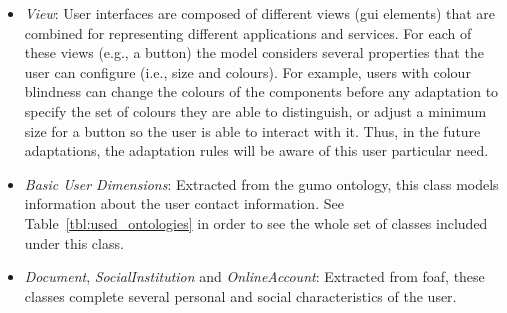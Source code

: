 \begin{itemize}
  \item \textit{View}: User interfaces are composed of different views (\acs{gui} 
  elements) that are combined for representing different applications and services. 
  For each of these views (e.g., a button) the model considers several properties 
  that the user can configure (i.e., size and colours). For example, users with 
  colour blindness can change the colours of the components before any adaptation 
  to specify the set of colours they are able to distinguish, or adjust a 
  minimum size for a button so the user is able to interact with it. Thus, in 
  the future adaptations, the adaptation rules will be aware of this user 
  particular need.
  
  \item \textit{Basic User Dimensions}: Extracted from the \ac{gumo} ontology,
  this class models information about the user contact information. See 
  Table~\ref{tbl:used_ontologies} in order to see the whole set of classes 
  included under this class.
  
  \item \textit{Document}, \textit{SocialInstitution} and \textit{OnlineAccount}:
  Extracted from \ac{foaf}, these classes complete several personal 
  and social characteristics of the user.
\end{itemize}



